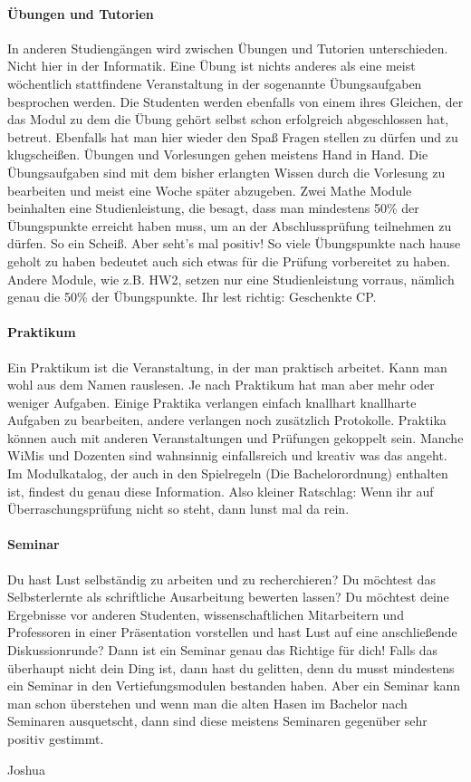 \paragraph{Übungen und Tutorien}
In anderen Studiengängen wird zwischen Übungen und Tutorien unterschieden. Nicht hier in der Informatik. Eine Übung ist nichts anderes als eine meist wöchentlich stattfindene Veranstaltung in der sogenannte Übungsaufgaben besprochen werden. Die Studenten werden ebenfalls von einem ihres Gleichen, der das Modul zu dem die Übung gehört selbst schon erfolgreich abgeschlossen hat, betreut. Ebenfalls hat man hier wieder den Spaß Fragen stellen zu dürfen und zu klugscheißen. Übungen und Vorlesungen gehen meistens Hand in Hand. Die Übungsaufgaben sind mit dem bisher erlangten Wissen durch die Vorlesung zu bearbeiten und meist eine Woche später abzugeben. Zwei Mathe Module beinhalten eine Studienleistung, die besagt, dass man mindestens 50\% der Übungspunkte erreicht haben muss, um an der Abschlussprüfung teilnehmen zu dürfen. So ein Scheiß. Aber seht's mal positiv! So viele Übungspunkte nach hause geholt zu haben bedeutet auch sich etwas für die Prüfung vorbereitet zu haben. Andere Module, wie z.B. HW2, setzen nur eine Studienleistung vorraus, nämlich genau die 50\% der Übungspunkte. Ihr lest richtig: Geschenkte CP.

\paragraph{Praktikum}
Ein Praktikum ist die Veranstaltung, in der man praktisch arbeitet. Kann man wohl aus dem Namen rauslesen. Je nach Praktikum hat man aber mehr oder weniger Aufgaben. Einige Praktika verlangen einfach knallhart knallharte Aufgaben zu bearbeiten, andere verlangen noch zusätzlich Protokolle. Praktika können auch mit anderen Veranstaltungen und Prüfungen gekoppelt sein. Manche WiMis und Dozenten sind wahnsinnig einfallsreich und kreativ was das angeht. Im Modulkatalog, der auch in den Spielregeln (Die Bachelorordnung) enthalten ist, findest du genau diese Information. Also kleiner Ratschlag: Wenn ihr auf Überraschungsprüfung nicht so steht, dann lunst mal da rein.

\paragraph{Seminar}
Du hast Lust selbständig zu arbeiten und zu recherchieren? Du möchtest das Selbsterlernte als schriftliche Ausarbeitung bewerten lassen? Du möchtest deine Ergebnisse vor anderen Studenten, wissenschaftlichen Mitarbeitern und Professoren in einer Präsentation vorstellen und hast Lust auf eine anschließende Diskussionrunde? Dann ist ein Seminar genau das Richtige für dich! Falls das überhaupt nicht dein Ding ist, dann hast du gelitten, denn du musst mindestens ein Seminar in den Vertiefungsmodulen bestanden haben. Aber ein Seminar kann man schon überstehen und wenn man die alten Hasen im Bachelor nach Seminaren ausquetscht, dann sind diese meistens Seminaren gegenüber sehr positiv gestimmt.

\begin{flushright}Joshua\end{flushright}

